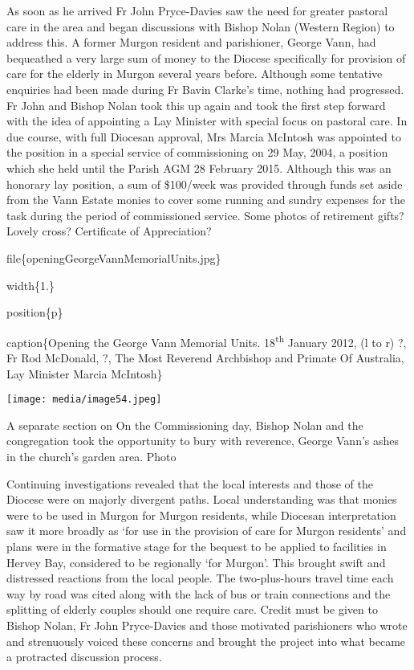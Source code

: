 As soon as he arrived Fr John Pryce-Davies saw the need for greater pastoral care in the area and began discussions with Bishop Nolan (Western Region) to address this. A former Murgon resident and parishioner, George Vann, had bequeathed a very large sum of money to the Diocese specifically for provision of care for the elderly in Murgon several years before. Although some tentative enquiries had been made during Fr Bavin Clarke's time, nothing had progressed. Fr John and Bishop Nolan took this up again and took the first step forward with the idea of appointing a Lay Minister with special focus on pastoral care. In due course, with full Diocesan approval, Mrs Marcia McIntosh was appointed to the position in a special service of commissioning on 29 May, 2004, a position which she held until the Parish AGM 28 February 2015. Although this was an honorary lay position, a sum of \$100/week was provided through funds set aside from the Vann Estate monies to cover some running and sundry expenses for the task during the period of commissioned service. Some photos of retirement gifts? Lovely cross? Certificate of Appreciation?

file\{openingGeorgeVannMemorialUnits.jpg\}

width\{1.\}

position\{p\}

caption\{Opening the George Vann Memorial Units. 18\textsuperscript{th} January 2012, (l to r) ?, Fr Rod McDonald, ?, The Most Reverend Archbishop and Primate Of Australia, Lay Minister Marcia McIntosh\}

\texttt{[image: media/image54.jpeg]}

A separate section on On the Commissioning day, Bishop Nolan and the congregation took the opportunity to bury with reverence, George Vann's ashes in the church's garden area. Photo

Continuing investigations revealed that the local interests and those of the Diocese were on majorly divergent paths. Local understanding was that monies were to be used in Murgon for Murgon residents, while Diocesan interpretation saw it more broadly as `for use in the provision of care for Murgon residents' and plans were in the formative stage for the bequest to be applied to facilities in Hervey Bay, considered to be regionally `for Murgon'. This brought swift and distressed reactions from the local people. The two-plus-hours travel time each way by road was cited along with the lack of bus or train connections and the splitting of elderly couples should one require care. Credit must be given to Bishop Nolan, Fr John Pryce-Davies and those motivated parishioners who wrote and strenuously voiced these concerns and brought the project into what became a protracted discussion process.

